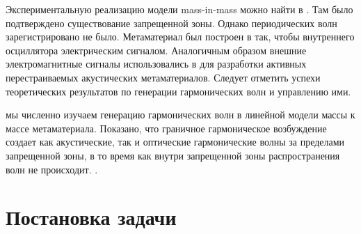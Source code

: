 Экспериментальную реализацию модели mass-in-mass можно найти в \cite{Cvet, Yang, Yao2008, Zhou2015}. Там было подтверждено существование запрещенной зоны. Однако периодических волн зарегистрировано не было. Метаматериал был построен в \cite{Yang} так, чтобы  внутреннего осциллятора электрическим сигналом. Аналогичным образом внешние электромагнитные сигналы использовались в \cite{Chen2014, Xiao2015} для разработки активных перестраиваемых акустических метаматериалов. Следует отметить успехи теоретических результатов по генерации гармонических волн и управлению ими.

 мы численно изучаем генерацию гармонических волн в линейной модели массы к массе метаматериала. Показано, что граничное гармоническое возбуждение создает как акустические, так и оптические гармонические волны за пределами запрещенной зоны, в то время как внутри запрещенной зоны распространения волн не происходит. .

\section{Постановка задачи}

